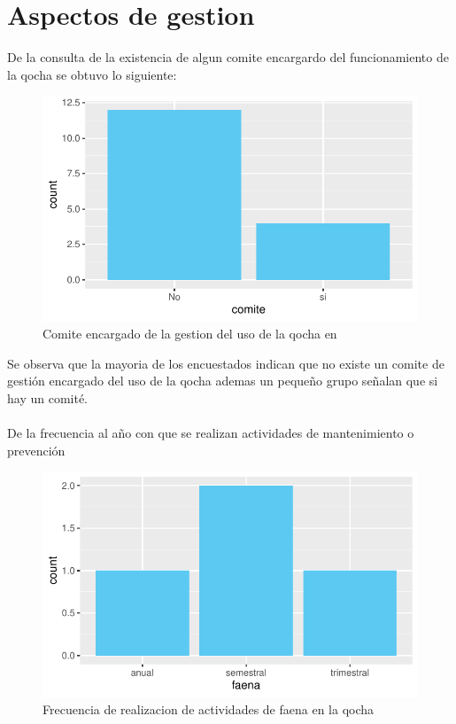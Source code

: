 \documentclass[12pt]{article}\usepackage[]{graphicx}\usepackage[]{xcolor}
\makeatletter
\def\maxwidth{ %
  \ifdim\Gin@nat@width>\linewidth
    \linewidth
  \else
    \Gin@nat@width
  \fi
}
\newenvironment{knitrout}{}{} %
\makeatother
\begin{document}
	\section{Aspectos de gestion}
	De la consulta de la existencia de algun comite encargardo del funcionamiento de la qocha se obtuvo lo siguiente:
	\begin{figure}[H]
	\centering
\begin{knitrout}
\color{fgcolor}
\includegraphics[width=\maxwidth]{figure/veintitres-1} 
\end{knitrout}
	\caption{Comite encargado de la gestion del uso de la qocha en \comunidad}
	\end{figure}
	Se observa que la mayoria de los encuestados indican que no existe un comite de gestión encargado del uso de la qocha ademas un pequeño grupo señalan que si hay un comité.\\
	\\
	De la frecuencia al año con que se realizan actividades de mantenimiento o prevención
	\begin{figure}[H]
	\centering
\begin{knitrout}
\color{fgcolor}
\includegraphics[width=\maxwidth]{figure/veinticuatro-1} 
\end{knitrout}
	\caption{Frecuencia de realizacion de actividades de faena en la qocha}
	\end{figure}
\end{document}
